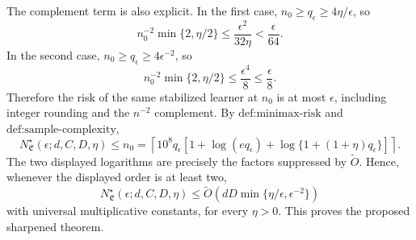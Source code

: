 The complement term is also explicit. In the first case, \(n_0\ge q_\epsilon\ge4\eta/\epsilon\), so
\[
n_0^{-2}\min\{2,\eta/2\}
\le\frac{\epsilon^2}{32\eta}<\frac\epsilon{64}.
\]
In the second case, \(n_0\ge q_\epsilon\ge4\epsilon^{-2}\), so
\[
n_0^{-2}\min\{2,\eta/2\}
\le\frac{\epsilon^4}{8}\le\frac\epsilon8.
\]
Therefore the risk of the same stabilized learner at \(n_0\) is at most \(\epsilon\), including integer rounding and the \(n^{-2}\) complement. By \(\text{def:minimax-risk}\) and \(\text{def:sample-complexity}\),
\[
N^\star_{\mathfrak E}(\epsilon;d,C,D,\eta)
\le n_0
=\left\lceil10^8q_\epsilon
\left[1+\log(eq_\epsilon)+\log\{1+(1+\eta)q_\epsilon\}\right]\right\rceil.
\]
The two displayed logarithms are precisely the factors suppressed by \(\widetilde O\). Hence, whenever the displayed order is at least two,
\[
N^\star_{\mathfrak E}(\epsilon;d,C,D,\eta)
\le\widetilde O\left(dD\min\{\eta/\epsilon,\epsilon^{-2}\}\right)
\]
with universal multiplicative constants, for every \(\eta>0\). This proves the proposed sharpened theorem.